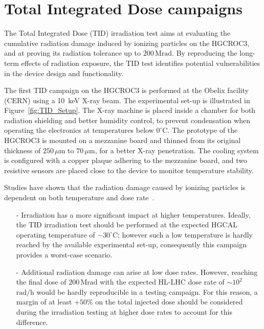 \section{Total Integrated Dose campaigns}
\label{sec:Total Integrated Dose} 

The Total Integrated Dose (TID) irradiation test aims at evaluating the cumulative radiation damage induced by ionizing particles on the HGCROC3, and at proving its radiation tolerance up to $200\,\textrm{Mrad}$. By reproducing the long-term effects of radiation exposure, the TID test identifies potential vulnerabilities in the device design and functionality.

\bigbreak

The first TID campaign on the HGCROC3 is performed at the Obelix facility (CERN) using a 10~keV X-ray beam. The experimental set-up is illustrated in Figure~\ref{fig:TID_Setup}.
The X-ray machine is placed inside a chamber for both radiation shielding and better humidity control, to prevent condensation when operating the electronics at temperatures below $0^{\circ}$C. 
The prototype of the HGCROC3 is mounted on a mezzanine board and thinned from its original thickness of $250\,\mu\textrm{m}$ to $70\,\mu\textrm{m}$, for a better X-ray penetration.
The cooling system is configured with a copper plaque adhering to the mezzanine board, and two resistive sensors are placed close to the device to monitor temperature stability.

\bigbreak

Studies have shown that the radiation damage caused by ionizing particles is dependent on both temperature and dose rate~\cite{giulio}.
\begin{itemize}
    \item [-] Irradiation has a more significant impact at higher temperatures.  Ideally, the TID irradiation test should be performed at the expected HGCAL operating temperature of $-30^{\circ}$C; however such a low temperature is hardly reached by the available experimental set-up, consequently this campaign provides a worst-case scenario. 
    \item [-]  Additional radiation damage can arise at low dose rates. However, reaching the final dose of $200\,\textrm{Mrad}$ with the expected HL-LHC dose rate of $\sim10^2$~$\textrm{rad/h}$ would be hardly reproducible in a testing campaign. For this reason, a margin of at least +$50\%$ on the total injected dose should be considered during the irradiation testing at higher dose rates to account for this difference. 
\end{itemize}

